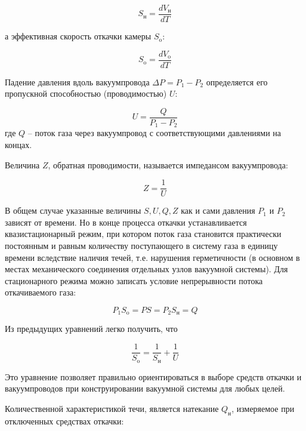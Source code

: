 \documentclass[a4paper, 12pt]{article} %
\begin{document}
\begin{equation}
    S_{\text{н}} = \frac{dV_{\text{н}}}{dT}
\end{equation}

а эффективная скорость откачки камеры $S_{\text{o}}$:

\begin{equation}
    S_{\text{o}} = \frac{dV_{\text{o}}}{dT}
\end{equation}

Падение давления вдоль вакуумпровода $\Delta P = P_1 - P_2$ определяется его пропускной способностью (проводимостью) $U$:

\begin{equation}
    U = \frac{Q}{P_1 - P_2}
\end{equation}
где $Q$ -- поток газа через вакуумпровод с соответствующими
давлениями на концах.

Величина $Z$, обратная проводимости, называется импедансом вакуумпровода:

\begin{equation}
    Z = \frac{1}{U}
\end{equation}

В общем случае указанные величины $S, U, Q, Z$ как и сами давления $P_1$ и $P_2$ зависят от времени. Но в конце процесса откачки устанавливается квазистационарный режим, при котором поток газа становится практически постоянным и равным количеству поступающего в систему газа
в единицу времени вследствие наличия течей, т.е. нарушения герметичности (в основном в местах механического соединения отдельных узлов
вакуумной системы). Для стационарного режима можно записать условие
непрерывности потока откачиваемого газа:

\begin{equation}
    P_1S_{\text{o}} = PS = P_2S_{\text{н}} = Q
\end{equation}

Из предыдущих уравнений легко получить, что

\begin{equation}
    \frac{1}{S_{\text{o}}} = \frac{1}{S_{\text{н}}} + \frac{1}{U}
\end{equation}

Это уравнение позволяет правильно ориентироваться в выборе средств
откачки и вакуумпроводов при конструировании вакуумной системы для
любых целей.

Количественной характеристикой течи, является натекание $Q_{\text{н}}$, измеряемое при отключенных средствах откачки:
\end{document}
